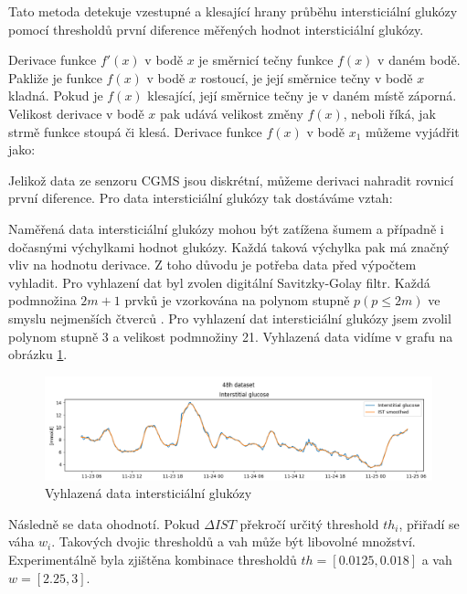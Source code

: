 Tato metoda detekuje vzestupné a klesající hrany průběhu intersticiální glukózy pomocí thresholdů první diference měřených hodnot intersticiální glukózy.

Derivace funkce $f'(x)$ v bodě $x$ je směrnicí tečny funkce $f(x)$ v daném bodě. Pakliže je funkce $f(x)$ v bodě $x$ rostoucí, je její směrnice tečny v bodě $x$ kladná. Pokud je $f(x)$ klesající, její směrnice tečny je v daném místě záporná. Velikost derivace v bodě $x$ pak udává velikost změny $f(x)$, neboli říká, jak strmě funkce stoupá či klesá. Derivace funkce $f(x)$ v bodě $x_{1}$ můžeme vyjádřit jako:


Jelikož data ze senzoru CGMS jsou diskrétní, můžeme derivaci nahradit rovnicí první diference. Pro data intersticiální glukózy tak dostáváme vztah:


Naměřená data intersticiální glukózy mohou být zatížena šumem a případně i dočasnými výchylkami hodnot glukózy. Každá taková výchylka pak má značný vliv na hodnotu derivace. Z toho důvodu je potřeba data před výpočtem vyhladit. Pro vyhlazení dat byl zvolen digitální Savitzky-Golay filtr. Každá podmnožina $2m+1$ prvků je vzorkována na polynom stupně $p (p\leq 2m)$ ve smyslu nejmenších čtverců \citep{cho.savgol}. Pro vyhlazení dat intersticiální glukózy jsem zvolil polynom stupně 3 a velikost podmnožiny 21. Vyhlazená data vidíme v grafu na obrázku \ref{fig:savgol}.

\begin{figure}[H]
\caption{Vyhlazená data intersticiální glukózy}
\label{fig:savgol}
\centering
\includegraphics[width=1\textwidth]{img/cho/savgol.png}
\end{figure}

Následně se data ohodnotí. Pokud $\Delta IST$ překročí určitý threshold $th_{i}$, přiřadí se váha $w_{i}$. Takových dvojic thresholdů a vah může být libovolné množství. Experimentálně byla zjištěna kombinace thresholdů $th=[0.0125, 0.018]$ a vah $w=[2.25, 3]$.

